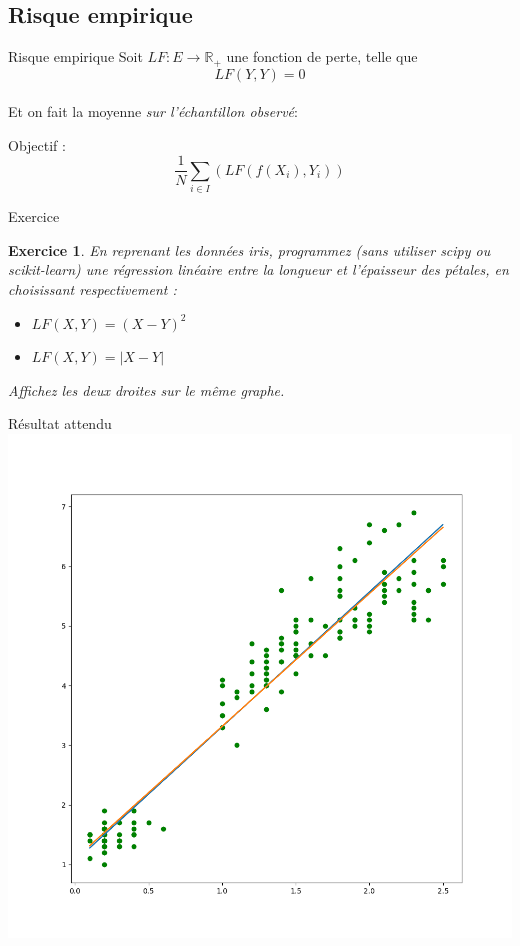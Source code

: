 \documentclass[11pt]{beamer}
\newtheorem{exercice}{Exercice}
\begin{document}
\subsection{Risque empirique}

\begin{frame}{Risque empirique}
Soit $LF:E \rightarrow \mathbb{R}_+$ une fonction de perte, telle que
$$LF(Y,Y) = 0$$\\
Et on fait la moyenne \textit{sur l'échantillon observé}:

Objectif :
$$ \frac{1}{N}\sum_{i \in I} \left( LF(f(X_i),Y_i) \right)$$

\end{frame}


\begin{frame}{Exercice}
\begin{exercice}
En reprenant les données iris, programmez (sans utiliser scipy ou scikit-learn) une régression linéaire entre la longueur et l'épaisseur des pétales, en choisissant respectivement :
\begin{itemize}
	\item $LF(X,Y) = (X-Y)^2$
	\item $LF(X,Y) = |X-Y|$
\end{itemize}
Affichez les deux droites sur le même graphe.
\end{exercice}

\end{frame}

\begin{frame}{Résultat attendu}
\includegraphics[scale=0.3]{ext1}
\end{frame}
\end{document}
